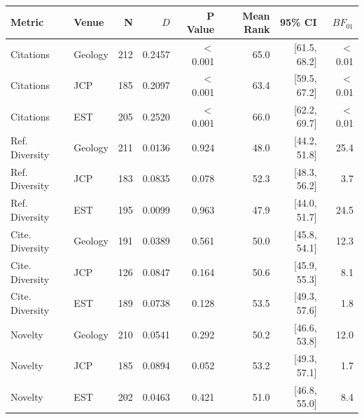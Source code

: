 \begin{tabular}{llrrrrrr}
  \toprule
Metric & Venue & N & $D$ & P Value & Mean Rank & 95\% CI & $BF_{01}$ \\ 
  \midrule
  Citations & Geology & 212 & 0.2457 & $<$0.001 & 65.0 & [61.5, 68.2] & $<$0.01 \\ 
  Citations & JCP & 185 & 0.2097 & $<$0.001 & 63.4 & [59.5, 67.2] & $<$0.01 \\ 
  Citations & EST & 205 & 0.2520 & $<$0.001 & 66.0 & [62.2, 69.7] & $<$0.01 \\ 
  Ref. Diversity & Geology & 211 & 0.0136 & 0.924 & 48.0 & [44.2, 51.8] & 25.4 \\ 
  Ref. Diversity & JCP & 183 & 0.0835 & 0.078 & 52.3 & [48.3, 56.2] & 3.7 \\ 
  Ref. Diversity & EST & 195 & 0.0099 & 0.963 & 47.9 & [44.0, 51.7] & 24.5 \\ 
  Cite. Diversity & Geology & 191 & 0.0389 & 0.561 & 50.0 & [45.8, 54.1] & 12.3 \\ 
  Cite. Diversity & JCP & 126 & 0.0847 & 0.164 & 50.6 & [45.9, 55.3] & 8.1 \\ 
  Cite. Diversity & EST & 189 & 0.0738 & 0.128 & 53.5 & [49.3, 57.6] & 1.8 \\ 
  Novelty & Geology & 210 & 0.0541 & 0.292 & 50.2 & [46.6, 53.8] & 12.0 \\ 
  Novelty & JCP & 185 & 0.0894 & 0.052 & 53.2 & [49.3, 57.1] & 1.7 \\ 
  Novelty & EST & 202 & 0.0463 & 0.421 & 51.0 & [46.8, 55.0] & 8.4 \\ 
   \bottomrule
\end{tabular}
